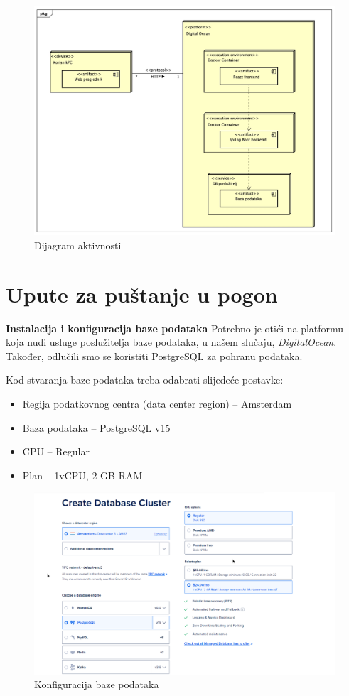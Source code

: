 			\begin{figure}[H]
				\includegraphics[scale=0.28]{dijagrami/dijagram_razmjestaja.jpeg}
				\centering
				\caption{Dijagram aktivnosti}
				\label{fig:bpdiag}
			\end{figure}
			\eject 
		
		\section{Upute za puštanje u pogon}
			\noindent \textbf{Instalacija i konfiguracija baze podataka}
			\noindent Potrebno je otići na platformu koja nudi usluge poslužitelja baze podataka, 
			u našem slučaju, \textit{DigitalOcean}. Također, odlučili smo se koristiti PostgreSQL
			za pohranu podataka.

			\noindent Kod stvaranja baze podataka treba odabrati slijedeće postavke:
			\begin{itemize}
				\item Regija podatkovnog centra (data center region) – Amsterdam
				\item Baza podataka – PostgreSQL v15
				\item CPU – Regular
				\item Plan – 1vCPU, 2 GB RAM
			\end{itemize}

			\begin{figure}[H]
				\includegraphics[scale=0.4]{slike/conf_base.png}
				\centering
				\caption{Konfiguracija baze podataka}
				\label{fig:baseconf}
			\end{figure}


